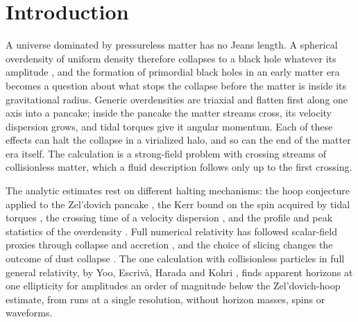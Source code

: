 \documentclass[aps,prd,twocolumn,10pt,superscriptaddress,nofootinbib,longbibliography,floatfix]{revtex4-2}
\begin{document}
\begin{abstract}
finder fails on a resolved horizon in the periodic box; and the first shell crossing of a triaxial peak lags the Zel'dovich time, by an amount that shrinks with the amplitude as an effect of first order in the curvature perturbation does.
\end{abstract}

\maketitle

\section{Introduction}\label{sec:intro}

A universe dominated by pressureless matter has no Jeans length. A spherical overdensity of uniform density therefore collapses to a black hole whatever its amplitude \cite{Ebrahimian:2025md}, and the formation of primordial black holes in an early matter era becomes a question about what stops the collapse before the matter is inside its gravitational radius. Generic overdensities are triaxial and flatten first along one axis into a pancake; inside the pancake the matter streams cross, its velocity dispersion grows, and tidal torques give it angular momentum. Each of these effects can halt the collapse in a virialized halo, and so can the end of the matter era itself. The calculation is a strong-field problem with crossing streams of collisionless matter, which a fluid description follows only up to the first crossing.

The analytic estimates rest on different halting mechanisms: the hoop conjecture applied to the Zel'dovich pancake \cite{Harada:2016hoop}, the Kerr bound on the spin acquired by tidal torques \cite{Harada:2017spin}, the crossing time of a velocity dispersion \cite{Harada:2022disp}, and the profile and peak statistics of the overdensity \cite{Ebrahimian:2025md,Ye:2025md}. Full numerical relativity has followed scalar-field proxies through collapse and accretion \cite{deJong:2021nr,deJong:2023spin}, and the choice of slicing changes the outcome of dust collapse \cite{Munoz:2026gauge}. The one calculation with collisionless particles in full general relativity, by Yoo, Escriv\`a, Harada and Kohri \cite{Yoo:2026mdpbh}, finds apparent horizons at one ellipticity for amplitudes an order of magnitude below the Zel'dovich-hoop estimate, from runs at a single resolution, without horizon masses, spins or waveforms.
\end{document}
